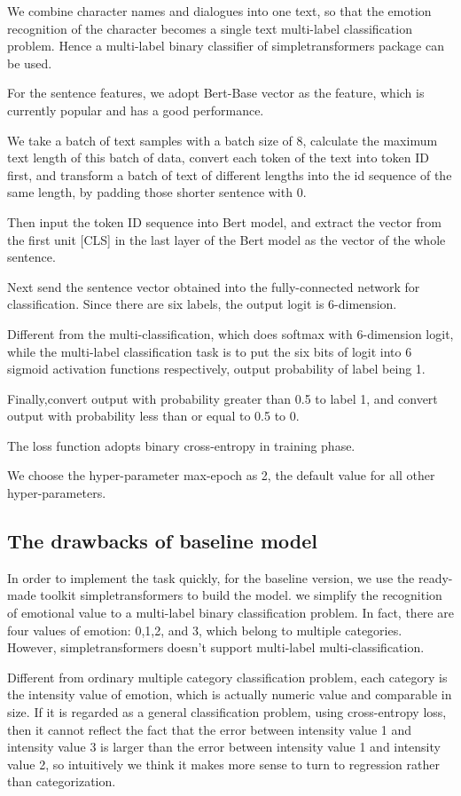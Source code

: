 \documentclass[12pt,twocolumn,letterpaper]{article}
\begin{document}
 We combine character names and dialogues into one text, so that the emotion recognition of the character becomes a single text multi-label classification problem. Hence a multi-label binary classifier of simpletransformers package can be used.

 For the sentence features, we adopt Bert-Base vector as the feature,  which is currently popular and has a good performance.  

 We take a batch of text samples with a batch size of 8, calculate the maximum text length of this batch of data, convert each token of the text into token ID first, and transform a batch of text of different lengths into the id sequence of the same length, by padding those shorter sentence with 0.
 
 Then input the token ID sequence into Bert model, and extract the vector from the first unit [CLS] in the last layer of the Bert model as the vector of the whole sentence.  

 Next send the sentence vector obtained into the fully-connected network for classification. Since there are six labels, the output logit is 6-dimension.  

 Different from the multi-classification, which does softmax with 6-dimension logit, while the multi-label classification task is to put the six bits of logit into 6 sigmoid activation functions respectively, output probability of label being 1.  
 
 Finally,convert output with probability greater than 0.5 to label 1, and convert output with probability less than or equal to 0.5 to 0. 

The loss function adopts binary cross-entropy in training phase.

We choose the hyper-parameter max-epoch as 2, the default value for all other hyper-parameters. 

\subsection{The drawbacks of baseline model}
In order to implement the task quickly, for the baseline version, we use the ready-made toolkit simpletransformers to build the model. we  simplify the recognition of emotional value to a multi-label binary classification problem. In fact, there are four values of emotion: 0,1,2, and 3, which belong to multiple categories. However, simpletransformers doesn't support multi-label multi-classification.

Different from ordinary multiple category classification problem, each category is the intensity value of emotion, which is actually numeric value and comparable in size. If it is regarded as a general classification problem, using cross-entropy loss, then it cannot reflect the fact that the error between intensity value 1 and intensity value 3 is larger than the error between intensity value 1 and intensity value 2, so intuitively we think it makes more sense to turn to regression rather than categorization.  
\end{document}
